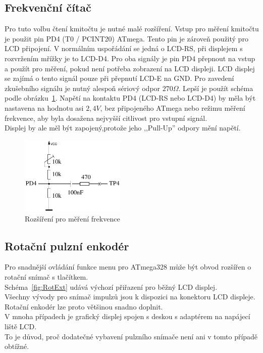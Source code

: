 \subsection{Frekvenční čítač}
\label{sec:frequency_counter}
\vspace{-0.2cm} 
Pro tuto volbu čtení kmitočtu je nutné malé rozšíření.
Vstup pro měření kmitočtu je použit pin PD4 (T0 / PCINT20) ATmega. Tento pin je zároveň použitý
pro LCD připojení.
V normálním uspořádání se jedná o LCD-RS, při displejem s rozvržením mřížky je to LCD-D4. Pro oba signály je pin PD4 přepnout na vstup a použít pro měření, pokud není potřeba zobrazení na LCD displeji.
LCD displej se zajímá  o tento signál pouze při přepnutí LCD-E na GND.
Pro zavedení zkušebního signálu je nutný alespoň sériový odpor \(270\Omega\).
Lepší je použít schéma podle obrázku~\ref{fig:FreqMes}.
Napětí na kontaktu PD4 (LCD-RS nebo LCD-D4) by měla být nastavena na hodnotu asi \(2,4V\), bez připojeného ATmega nebo režimu měření frekvence,
aby byla dosažena nejvyšší citlivost pro vstupní signál.\\
Displej by ale měl být zapojený,protože jeho ,,Pull-Up'' odpory mění napětí.

\begin{figure}[H]
\centering
\includegraphics[width=5cm]{../FIG/Frequency_addon.pdf}
\vspace{-0.2cm} 
\caption{Rozšíření pro měření frekvence}
\label{fig:FreqMes}
\end{figure}
\vspace{-0.4cm} 
\subsection{Rotační pulzní enkodér}
\vspace{-0.2cm} 
Pro snadnější ovládání funkce menu pro ATmega328 může být obvod rozšířen o rotační snímač
s tlačítkem.\\
Schéma~\ref{fig:RotExt} udává výchozí přiřazení pro běžný LCD displej.\\
Všechny vývody pro snímač impulzů jsou k dispozici na konektoru LCD displeje.\\ 
Rotační enkodér lze proto většinou snadno doplnit.\\
V mnoha případech je grafický displej spojen s deskou s adaptérem na napájecí liště LCD.\\
To je důvod, proč dodatečné vybavení pulzního snímače není ani v tomto případě obtížné.

